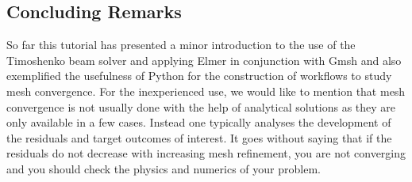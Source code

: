 \subsection*{Concluding Remarks}

So far this tutorial has presented a minor introduction to the use of the Timoshenko beam solver and applying Elmer in conjunction with Gmsh and also exemplified the usefulness of Python for the construction of workflows to study mesh convergence. For the inexperienced use, we would like to mention that mesh convergence is not usually done with the help of analytical solutions as they are only available in a few cases. Instead one typically analyses the development of the residuals and target outcomes of interest. It goes without saying that if the residuals do not decrease with increasing mesh refinement, you are not converging and you should check the physics and numerics of your problem. 

\vfill
\mbox{}

